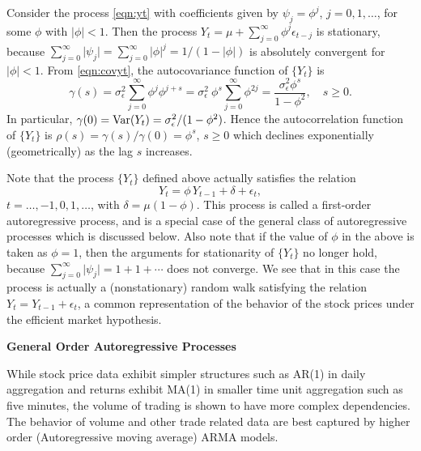 \begin{ex} \label{ex:autoregor1}
Consider the process \eqref{eqn:yt} with coefficients given by $\psi_j = \phi^j$, $j= 0,1,\ldots$,  for some $\phi$ with $\lvert \phi \rvert < 1$. Then the process $Y_t = \mu + \sum_{j=0}^{\infty} \phi^j \epsilon_{t-j}$ is stationary, because $\sum_{j=0}^{\infty} \lvert \psi_j \rvert= \sum_{j=0}^{\infty} \lvert \phi \rvert^j = 1/(1 - \lvert \phi \rvert)$ is absolutely convergent for $\lvert \phi \rvert < 1$. From \eqref{eqn:covyt}, the autocovariance function of $\{ Y_t \}$ is
	\[
	\gamma(s)= \sigma^2_{\epsilon} \sum_{j=0}^{\infty} \phi^j \phi^{j+s}= \sigma^2_{\epsilon}\ \phi^s \sum_{j=0}^{\infty} \phi^{2j}= \frac{\sigma^2_{\epsilon} \phi^s}{1 - \phi^2}, \quad s \geq 0.
	\]
In particular, $\gamma(0) = \operatorname{Var}(Y_t) = \sigma^2_{\epsilon}/(1-\phi^2)$. Hence the autocorrelation function of $\{ Y_t \}$ is $\rho(s)= \gamma(s) / \gamma(0)= \phi^s$, $ s \geq 0$ which declines exponentially (geometrically) as the lag $s$ increases.


Note that the process $\{Y_t\}$ defined above actually satisfies the relation 
	\[
	Y_t= \phi \, Y_{t-1} + \delta+\epsilon_t,
	\]
$t= \ldots ,-1, 0, 1, \ldots$, with $\delta = \mu(1 - \phi)$. This process is called a first-order autoregressive process, and is a special case of the general class of autoregressive processes which is discussed below. Also note that if the value of $\phi$ in the above is taken as  $\phi = 1$, then the arguments for stationarity of $\{Y_t\}$ no longer hold, because $\sum_{j=0}^{\infty} \lvert \psi_j \rvert = 1 + 1 + \cdots$ does not converge. We see that in this case the process is actually a (nonstationary) random walk satisfying the relation  $Y_t = Y_{t-1} + \epsilon_t$, a common representation of the behavior of the stock prices under the efficient market hypothesis. \xqed
\end{ex}



\pagebreak



\noindent\textbf{General Order Autoregressive Processes} \twomedskip


While stock price data exhibit simpler structures such as AR(1) in daily aggregation and returns exhibit MA(1) in smaller time unit aggregation such as five minutes, the volume of trading is shown to have more complex dependencies. The behavior of volume and other trade related data are best captured by higher order (Autoregressive moving average) ARMA models. 


